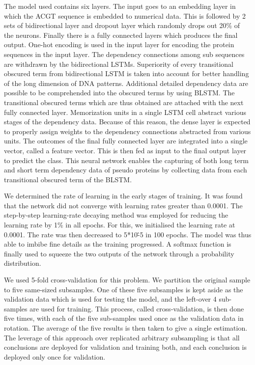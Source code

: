 \documentclass[conference]{IEEEtran}
\begin{document}
The  model used contains six layers. The input goes to an embedding layer in which the ACGT sequence is embedded to numerical data. This is followed by 2 sets of bidirectional layer and dropout layer which randomly drops out 20\% of the neurons. Finally there is a fully connected layers which produces the final output. One-hot encoding is used in the input layer for encoding the protein sequences in the input layer.
The dependency connections among sub sequences are withdrawn by the bidirectional LSTMs. Superiority of every transitional obscured term from bidirectional LSTM is taken into account for better handling of the long dimension of DNA patterns. Additional detailed dependency data are possible to be comprehended into the obscured terms by using BLSTM. The transitional obscured terms which are thus obtained are attached with the next fully connected layer. Memorization units in a single LSTM cell abstract various stages of the dependency data. Because of this reason, the dense layer is expected to properly assign weights to the dependency connections abstracted from various units. The outcomes of the final fully connected layer are integrated into a single vector, called a feature vector. This is then fed as input to the final output layer to predict the class.
This neural network enables the capturing of both long term and short term dependency data of pseudo proteins by collecting data from each transitional obscured term of the BLSTM.\newline

We determined the rate of learning in the early stages of training. It was found that the network did not converge with learning rates greater than 0.0001. The step-by-step learning-rate decaying method was employed for reducing the learning rate by 1\% in all epochs. For this, we initialised the learning rate at 0.0001. The rate was then decreased to 5*10\^-5 in 100 epochs. The model was thus able to imbibe fine details as the training progressed. A softmax function is finally used to squeeze the two outputs of the network through a probability distribution.
\newline

We used 5-fold cross-validation for this problem. We partition the original sample to five same-sized subsamples. One of these five subsamples is kept aside as the validation data which is used for testing the model, and the left-over 4 sub-samples are used for training. This process, called cross-validation, is then done five times, with each of the five sub-samples used once as the validation data in rotation. The average of  the five results is then taken to give a single estimation. The leverage of this approach over replicated arbitrary subsampling is that all conclusions are deployed for validation and training both, and each conclusion is deployed only once for validation.
\end{document}
